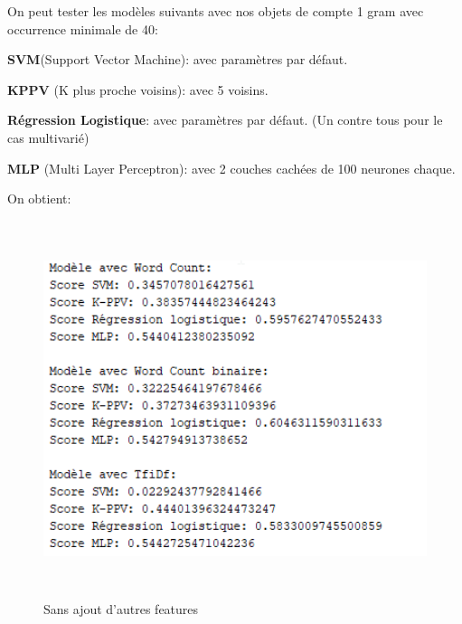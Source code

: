 \documentclass[12pt,french]{article}
\begin{document}
On peut tester les modèles suivants avec nos objets de compte 1 gram avec occurrence minimale de 40:
\begin{description}
\item \textbf{SVM}(Support Vector Machine): avec paramètres par défaut.
\item \textbf{KPPV} (K plus proche voisins): avec 5 voisins.
\item \textbf{Régression Logistique}: avec paramètres par défaut. (Un contre tous pour le cas multivarié)
\item \textbf{MLP} (Multi Layer Perceptron): avec 2 couches cachées de 100 neurones chaque.
\end{description}


On obtient:

\begin{figure}[h!] %
	\begin{minipage}[b]{0.45\textwidth}
		\includegraphics[width=\textwidth,height=11cm]{analyse_rapide_sans_features}	
		\caption*{Sans ajout d'autres features}
	\end{minipage}
	\hfill
	\begin{minipage}[b]{0.45\textwidth}

\end{minipage}
\end{figure}
\end{document}
